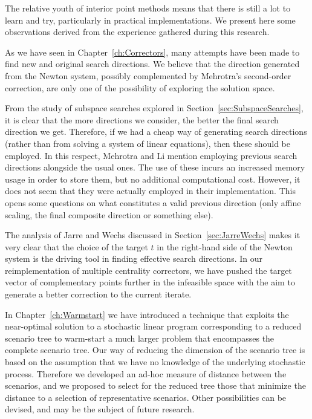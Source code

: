 The relative youth of interior point methods means that there is still
a lot to learn and try, particularly in practical implementations.
We present here some observations derived from the experience
gathered during this research.

As we have seen in Chapter~\ref{ch:Correctors}, many attempts
have been made to find new and original search directions.
We believe that the direction generated from the Newton system,
possibly complemented by Mehrotra's second-order correction,
are only one of the possibility of exploring the solution space.

From the study of subspace searches explored in
Section~\ref{sec:SubspaceSearches}, it is clear that the more 
directions we consider, the better the final search direction 
we get. Therefore, if we had a cheap way of generating search
directions (rather than from solving a system of linear equations),
then these should be employed.
In this respect, Mehrotra and Li \cite{MehrotraLi} 
mention employing previous search directions alongside the usual ones. 
The use of these incurs an increased memory usage 
in order to store them, but no additional computational cost.
However, it does not seem that they were actually employed in
their implementation.
This opens some questions on what constitutes a valid
previous direction (only affine scaling, the final composite direction
or something else).

The analysis of Jarre and Wechs discussed in Section~\ref{sec:JarreWechs}
makes it very clear that the choice of the target $t$ in
the right-hand side of the Newton system is the driving
tool in finding effective search directions.
In our reimplementation of multiple centrality correctors, we
have pushed the target vector of complementary points further
in the infeasible space with the aim to generate a better
correction to the current iterate.

In Chapter~\ref{ch:Warmstart}
we have introduced a technique that exploits the near-optimal solution
to a stochastic linear program corresponding to a 
reduced scenario tree to warm-start a much larger problem 
that encompasses the complete scenario tree.
Our way of reducing the dimension of the scenario tree 
is based on the assumption that we have no knowledge 
of the underlying stochastic process. 
Therefore we developed an ad-hoc measure of distance 
between the scenarios, and we proposed to select for the 
reduced tree those that minimize the distance to 
a selection of representative scenarios. 
Other possibilities can be devised, and may be 
the subject of future research.

